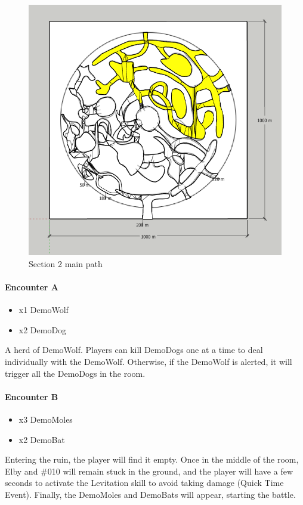 \begin{figure}[H]
	\centering
	\includegraphics[width=0.8\linewidth]{images/map/2D_map_section_02.png}
	\caption*{Section 2 main path}
\end{figure}

\paragraph{Encounter A}
\begin{itemize}
	\item x1 DemoWolf
	\item x2 DemoDog
\end{itemize}

A herd of DemoWolf. Players can kill DemoDogs one at a time to deal individually with the DemoWolf. Otherwise, if the DemoWolf is alerted, it will trigger all the DemoDogs in the room.

\paragraph{Encounter B}
\begin{itemize}
	\item x3 DemoMoles
	\item x2 DemoBat
\end{itemize}

Entering the ruin, the player will find it empty. Once in the middle of the room, Elby and \#010 will remain stuck in the ground, and the player will have a few seconds to activate the Levitation skill to avoid taking damage (Quick Time Event). Finally, the DemoMoles and DemoBats will appear, starting the battle.

